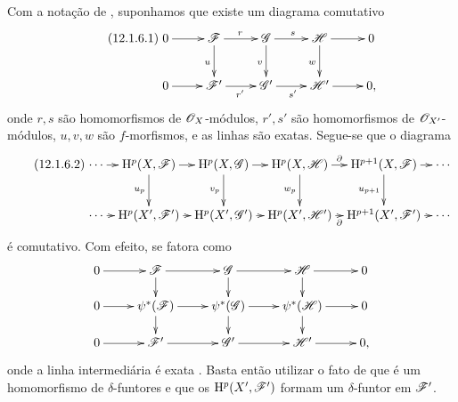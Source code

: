 \begin{remark}[12.1.6]
\label{0.12.1.6}
Com a notação de , suponhamos que existe um
diagrama comutativo
\[
\label{0.12.1.6.1}
\tag{12.1.6.1}
  \xymatrix{
    0\ar[r] & \sh{F}\ar[r]^r\ar[d]_u
      & \sh{G}\ar[r]^s\ar[d]_v
      & \sh{H}\ar[r]\ar[d]_w & 0\\
    0\ar[r] & \sh{F}'\ar[r]_{r'}
      & \sh{G}'\ar[r]_{s'}
      & \sh{H}'\ar[r] & 0,
  }
\]
onde $r,s$ são homomorfismos de $\mathscr{O}_X$-módulos,
$r',s'$ são homomorfismos de $\mathscr{O}_{X'}$-módulos,
$u,v,w$ são $f$-morfismos, e as linhas são exatas.
Segue-se que o diagrama
\[
\label{0.12.1.6.2}
\tag{12.1.6.2}
  \xymatrix@C=6pt{
    \cdots\ar[r]
      & \HH^p(X,\sh{F})\ar[r]\ar[d]_{u_p}
      & \HH^p(X,\sh{G})\ar[r]\ar[d]_{v_p}
      & \HH^p(X,\sh{H})\ar[r]^-\partial\ar[d]_{w_p}
      & \HH^{p+1}(X,\sh{F})\ar[r]\ar[d]_{u_{p+1}}
      & \cdots\\
    \cdots\ar[r]
      & \HH^p(X',\sh{F}')\ar[r]
      & \HH^p(X',\sh{G}')\ar[r]
      & \HH^p(X',\sh{H}')\ar[r]_-\partial
      & \HH^{p+1}(X',\sh{F}')\ar[r]
      & \cdots
  }
\]
é comutativo.
Com efeito,  se fatora como
\[
  \xymatrix@R=14pt{
    0\ar[r] & \sh{F}\ar[r]\ar[d]
      & \sh{G}\ar[r]\ar[d]
      & \sh{H}\ar[r]\ar[d] & 0\\
    0\ar[r] & \psi^*(\sh{F})\ar[r]\ar[d]
      & \psi^*(\sh{G})\ar[r]\ar[d]
      & \psi^*(\sh{H})\ar[r]\ar[d] & 0\\
    0\ar[r] & \sh{F}'\ar[r]
      & \sh{G}'\ar[r]
      & \sh{H}'\ar[r] & 0,
  }
\]
onde a linha intermediária é exata
.
Basta então utilizar o fato de que  é um
homomorfismo de $\delta$-funtores e que os
$\mathrm{H}^p(X',\mathscr{F}')$ formam um $\delta$-funtor em $\mathscr{F}'$.
\end{remark}

